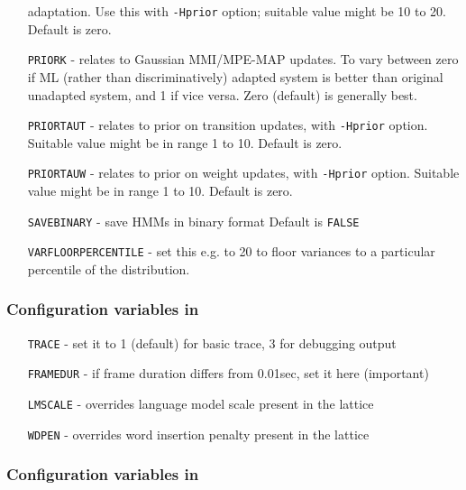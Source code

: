 \begin{itemize}
     adaptation.  Use this with {\tt -Hprior} option; suitable value might be 10 to 20.  Default is zero.
\item[{\tt PRIORK}]  - relates to Gaussian MMI/MPE-MAP updates.  To vary between zero if ML (rather than discriminatively) adapted system is better than
                original unadapted system, and 1 if vice versa.  Zero (default) is generally best. 
\item[{\tt PRIORTAUT}] - relates to prior on transition updates, with {\tt -Hprior} option.  Suitable value might be in range 1 to 10.  Default is zero.
\item[{\tt PRIORTAUW}] - relates to prior on weight updates, with {\tt -Hprior} option.  Suitable value might be in range 1 to 10.  Default is zero.
\item[{\tt SAVEBINARY}] - save HMMs in binary format Default is {\tt FALSE}
\item[{\tt VARFLOORPERCENTILE}] - set this e.g. to 20 to floor variances to a
   particular percentile of the distribution. 
\end{itemize}


\subsubsection{Configuration variables in }

\begin{itemize}
\item[\texttt{TRACE}] - set it to 1 (default) for basic trace, 3 for debugging output
\item[\texttt{FRAMEDUR}] - if frame duration differs from 0.01sec, set it here (important)
\item[\texttt{LMSCALE}] - overrides language model scale present in the lattice
\item[\texttt{WDPEN}] - overrides word insertion penalty present in the lattice
\end{itemize}

\subsubsection{Configuration variables in }


